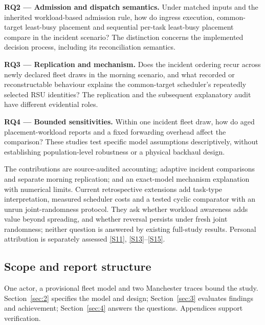 \documentclass[11pt,a4paper]{article}
\begin{document}
\textbf{RQ2 --- Admission and dispatch semantics.} Under matched inputs and the inherited workload-based admission rule, how do ingress execution, common-target least-busy placement and sequential per-task least-busy placement compare in the incident scenario? The distinction concerns the implemented decision process, including its reconciliation semantics.

\textbf{RQ3 --- Replication and mechanism.} Does the incident ordering recur across newly declared fleet draws in the morning scenario, and what recorded or reconstructable behaviour explains the common-target scheduler's repeatedly selected RSU identities? The replication and the subsequent explanatory audit have different evidential roles.

\textbf{RQ4 --- Bounded sensitivities.} Within one incident fleet draw, how do aged placement-workload reports and a fixed forwarding overhead affect the comparison? These studies test specific model assumptions descriptively, without establishing population-level robustness or a physical backhaul design.

The contributions are source-audited accounting; adaptive incident comparisons and separate morning replication; and an exact-model mechanism explanation with numerical limits. Current retrospective extensions add task-type interpretation, measured scheduler costs and a tested cyclic comparator with an unrun joint-randomness protocol. They ask whether workload awareness adds value beyond spreading, and whether reversal persists under fresh joint randomness; neither question is answered by existing full-study results. Personal attribution is separately assessed \hyperref[source-s11]{[S11]}, \hyperref[source-s13]{[S13]}--\hyperref[source-s15]{[S15]}.

\subsection{Scope and report structure}\label{sec:1.4}

One actor, a provisional fleet model and two Manchester traces bound the study. Section~\ref{sec:2} specifies the model and design; Section~\ref{sec:3} evaluates findings and achievement; Section~\ref{sec:4} answers the questions. Appendices support verification.
\end{document}
